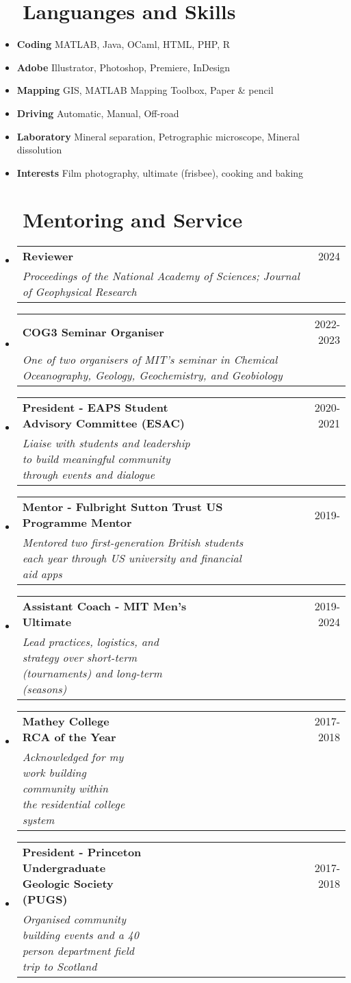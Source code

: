 \documentclass[letterpaper,20pt]{article}
\makeatletter
\newcommand{\resumeItem}[2]{
  \item\normalsize{
    \textbf{#1}{ #2 \vspace{-2pt}}
  }
}
\newcommand{\resumeSubheading}[4]{
  \vspace{-1pt}\item
    \begin{tabular*}{0.97\textwidth}{l@{\extracolsep{\fill}}r}
      \textbf{#1} & #2 \\
      \textit{#3} & \textit{#4} \\
    \end{tabular*}\vspace{-5pt}
}
\newcommand{\resumeSubItem}[2]{\resumeItem{#1}{#2}\vspace{-3pt}}
\newcommand{\resumeSubHeadingListStart}{\begin{itemize}[leftmargin=*]}
\newcommand{\resumeSubHeadingListEnd}{\end{itemize}}
\makeatother
\begin{document}
\section{~~Languanges and Skills}
  \resumeSubHeadingListStart
    \resumeSubItem{Coding}{MATLAB, Java, OCaml, HTML, PHP, R}
    \resumeSubItem{Adobe}{Illustrator, Photoshop, Premiere, InDesign}
    \resumeSubItem{Mapping}{GIS, MATLAB Mapping Toolbox, Paper \& pencil}
    \resumeSubItem{Driving}{Automatic, Manual, Off-road}
    \resumeSubItem{Laboratory}{Mineral separation, Petrographic microscope, Mineral dissolution}
    \resumeSubItem{Interests}{Film photography, ultimate (frisbee), cooking and baking}
    \resumeSubHeadingListEnd
    
\vspace{3pt}
\section{~~Mentoring and Service}
  \resumeSubHeadingListStart
    \resumeSubheading
    {Reviewer}{2024}
    {Proceedings of the National Academy of Sciences; Journal of Geophysical Research}{}
    \resumeSubheading
    {COG3 Seminar Organiser}{2022-2023}
    {One of two organisers of MIT's seminar in Chemical Oceanography, Geology, Geochemistry, and Geobiology}{}  
    \resumeSubheading
    {President - EAPS Student Advisory Committee (ESAC)}{~~~~~~~~~~~~~~~~~~2020-2021}
    {Liaise with students and leadership to build meaningful community through events and dialogue}{}  
  \resumeSubheading
    {Mentor - Fulbright Sutton Trust US Programme Mentor}{~~~~~~~~~2019-}
    {Mentored two first-generation British students each year through US university and financial aid apps}{}
\resumeSubheading
    {Assistant Coach - MIT Men's Ultimate}{~~~~~~~~~~~~~~~~~~~~2019-2024}
    {Lead practices, logistics, and strategy over short-term (tournaments) and long-term (seasons)}{}  
  \resumeSubheading
    {Mathey College RCA of the Year}{~~~~~~~~~~~~~~~~~~~~~~~~~~~~~~~~2017-2018}
    {Acknowledged for my work building community within the residential college system}{}  
    \resumeSubheading
    {President - Princeton Undergraduate Geologic Society (PUGS)}{~~~~~~~~~~~~~~~~~~~~~~~~~~~~~2017-2018}
    {Organised community building events and a 40 person department field trip  to Scotland}{}  
\resumeSubHeadingListEnd


\vspace{3pt}
\end{document}
